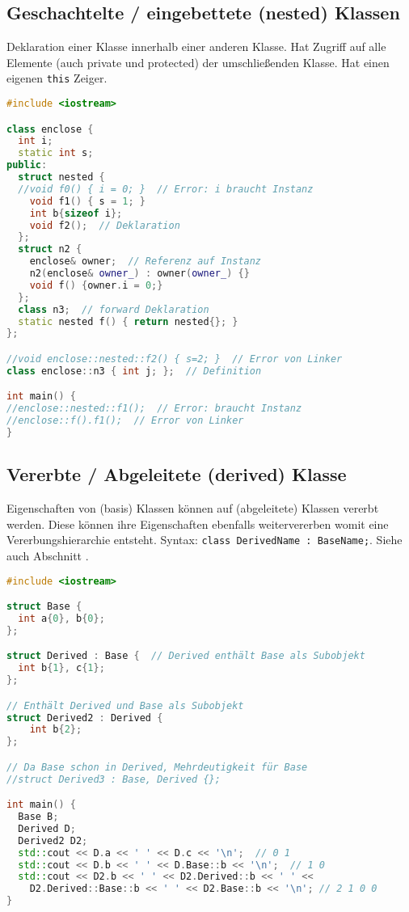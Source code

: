 \subsection{Geschachtelte / eingebettete (nested) Klassen}

Deklaration einer Klasse innerhalb einer anderen Klasse. Hat Zugriff auf alle
Elemente (auch private und protected) der umschließenden Klasse. Hat einen
eigenen \lstinline|this| Zeiger.

\begin{lstlisting}[language=C++]
#include <iostream>

class enclose {
  int i;
  static int s;
public:
  struct nested {
  //void f0() { i = 0; }  // Error: i braucht Instanz
    void f1() { s = 1; }
    int b{sizeof i};
    void f2();  // Deklaration
  };
  struct n2 {
    enclose& owner;  // Referenz auf Instanz
    n2(enclose& owner_) : owner(owner_) {}
    void f() {owner.i = 0;}
  };
  class n3;  // forward Deklaration
  static nested f() { return nested{}; }
};

//void enclose::nested::f2() { s=2; }  // Error von Linker
class enclose::n3 { int j; };  // Definition

int main() {
//enclose::nested::f1();  // Error: braucht Instanz
//enclose::f().f1();  // Error von Linker
}
\end{lstlisting}

\subsection{Vererbte / Abgeleitete (derived) Klasse}
\label{ssec:derivedClass}

Eigenschaften von (basis) Klassen können auf (abgeleitete) Klassen vererbt
werden. Diese können ihre Eigenschaften ebenfalls weitervererben womit eine
Vererbungshierarchie entsteht. Syntax:
\lstinline|class DerivedName : BaseName;|.
Siehe auch Abschnitt .

\begin{lstlisting}[language=C++]
#include <iostream>

struct Base {
  int a{0}, b{0};
};

struct Derived : Base {  // Derived enthält Base als Subobjekt
  int b{1}, c{1};
};

// Enthält Derived und Base als Subobjekt
struct Derived2 : Derived {
    int b{2};
};

// Da Base schon in Derived, Mehrdeutigkeit für Base
//struct Derived3 : Base, Derived {};

int main() {
  Base B;
  Derived D;
  Derived2 D2;
  std::cout << D.a << ' ' << D.c << '\n';  // 0 1
  std::cout << D.b << ' ' << D.Base::b << '\n';  // 1 0
  std::cout << D2.b << ' ' << D2.Derived::b << ' ' <<
    D2.Derived::Base::b << ' ' << D2.Base::b << '\n'; // 2 1 0 0
}
\end{lstlisting}

